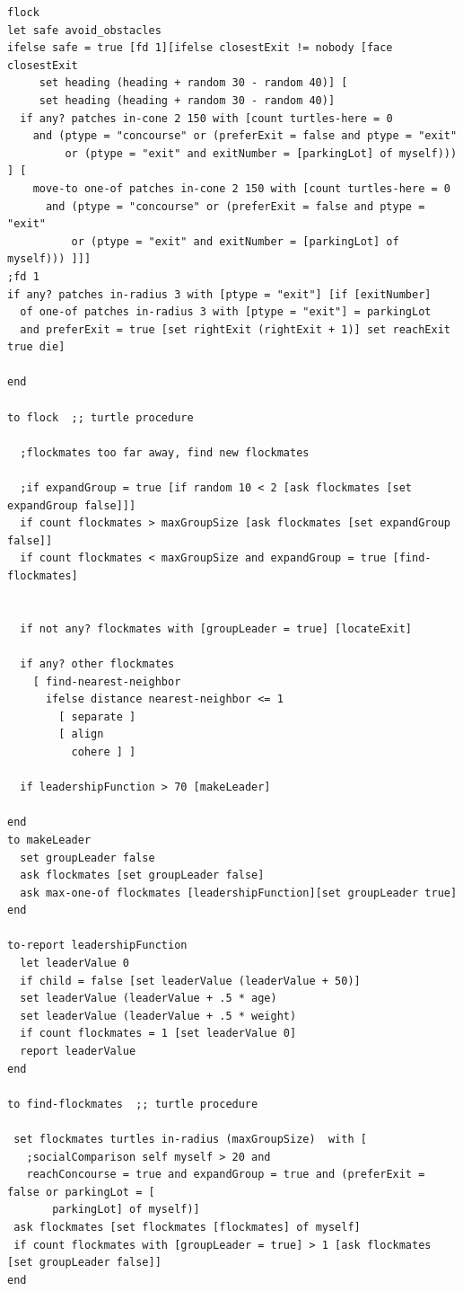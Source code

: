 \documentclass{article}
\begin{document}
\begin{lstlisting}
flock
let safe avoid_obstacles
ifelse safe = true [fd 1][ifelse closestExit != nobody [face closestExit
     set heading (heading + random 30 - random 40)] [
     set heading (heading + random 30 - random 40)]
  if any? patches in-cone 2 150 with [count turtles-here = 0 
    and (ptype = "concourse" or (preferExit = false and ptype = "exit"
         or (ptype = "exit" and exitNumber = [parkingLot] of myself))) ] [
    move-to one-of patches in-cone 2 150 with [count turtles-here = 0 
      and (ptype = "concourse" or (preferExit = false and ptype = "exit" 
          or (ptype = "exit" and exitNumber = [parkingLot] of myself))) ]]]
;fd 1
if any? patches in-radius 3 with [ptype = "exit"] [if [exitNumber] 
  of one-of patches in-radius 3 with [ptype = "exit"] = parkingLot 
  and preferExit = true [set rightExit (rightExit + 1)] set reachExit true die]

end

to flock  ;; turtle procedure
  
  ;flockmates too far away, find new flockmates
  
  ;if expandGroup = true [if random 10 < 2 [ask flockmates [set expandGroup false]]]
  if count flockmates > maxGroupSize [ask flockmates [set expandGroup false]]
  if count flockmates < maxGroupSize and expandGroup = true [find-flockmates]

 
  if not any? flockmates with [groupLeader = true] [locateExit]
  
  if any? other flockmates
    [ find-nearest-neighbor
      ifelse distance nearest-neighbor <= 1
        [ separate ]
        [ align
          cohere ] ]
    
  if leadershipFunction > 70 [makeLeader]
  
end
to makeLeader 
  set groupLeader false
  ask flockmates [set groupLeader false]
  ask max-one-of flockmates [leadershipFunction][set groupLeader true]
end

to-report leadershipFunction
  let leaderValue 0
  if child = false [set leaderValue (leaderValue + 50)]
  set leaderValue (leaderValue + .5 * age)
  set leaderValue (leaderValue + .5 * weight)
  if count flockmates = 1 [set leaderValue 0]
  report leaderValue
end

to find-flockmates  ;; turtle procedure

 set flockmates turtles in-radius (maxGroupSize)  with [
   ;socialComparison self myself > 20 and 
   reachConcourse = true and expandGroup = true and (preferExit = false or parkingLot = [
       parkingLot] of myself)]
 ask flockmates [set flockmates [flockmates] of myself]
 if count flockmates with [groupLeader = true] > 1 [ask flockmates [set groupLeader false]]
end


\end{lstlisting}
\end{document}
